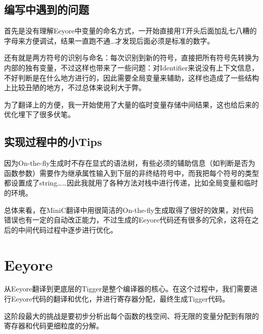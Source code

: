 \documentclass{ctexart}
\begin{document}
\subsection{编写中遇到的问题}

首先是没有理解Eeyore中变量的命名方式，一开始直接用T开头后面加乱七八糟的字母来方便调试，结果一直跑不通…才发现后面必须是标准的数字。

还有就是两方符号的识别与命名：每次识别到新的符号，直接把所有符号先转换为内部的独有变量，不过这样也带来了一些问题：对Identifier来说没有上下文信息，不好判断是在什么地方进行的，因此需要全局变量来辅助，这样也造成了一些结构上比较丑陋的地方，不过总体来说利大于弊。

为了翻译上的方便，我一开始使用了大量的临时变量存储中间结果，这也给后来的优化埋下了很多伏笔。

\subsection{实现过程中的小Tips}

因为On-the-fly生成时不存在显式的语法树，有些必须的辅助信息（如判断是否为函数参数）需要作为继承属性输入到下层的非终结符号中，而我把每个符号的类型都设置成了string……因此我就用了各种方法对栈中进行传递，比如全局变量和临时的环境。

总体来看，在MiniC翻译中用很简洁的On-the-fly生成取得了很好的效果，对代码错误也有一定的自动改正能力，不过生成的Eeyore代码还有很多的冗余，这将在之后的中间代码过程中逐步进行优化。


\section{Eeyore}

从Eeyore翻译到更底层的Tigger是整个编译器的核心。在这个过程中，我们需要进行Eeyore代码的翻译和优化，并进行寄存器分配，最终生成Tigger代码。

这阶段最大的挑战是要初步分析出每个函数的栈空间、将无限的变量分配到有限的寄存器和代码更细粒度的分解。
\end{document}
